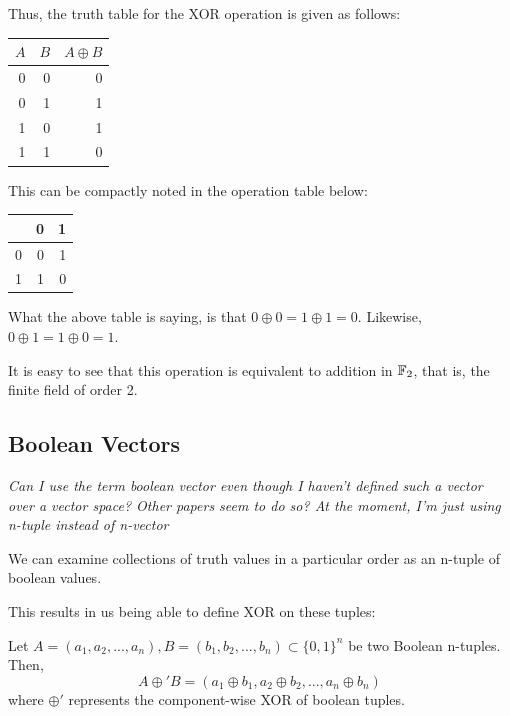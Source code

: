 Thus, the truth table for the XOR operation is given as follows:
\begin{center}
\begin{tabular}{|r|r|r|}
\hline
$A$ & $B$ & $A \oplus B$ \\\hline
0 & 0 & 0 \\\hline
0 & 1 & 1 \\\hline
1 & 0 & 1 \\\hline
1 & 1 & 0 \\\hline
\end{tabular}
\end{center}

This can be compactly noted in the operation table below:
\begin{center}
\begin{tabular}{|r|r|r|}
\hline  
& 0 & 1 \\\hline
0 & 0 & 1 \\\hline
1 & 1 & 0 \\\hline
\end{tabular}
\end{center}

What the above table is saying, is that $0 \oplus 0 = 1 \oplus 1 = 0$.
Likewise, $0 \oplus 1 = 1 \oplus 0 = 1$.

\begin{rem}
It is easy to see that this operation is equivalent to addition in ${\mathbb F}_2$,
that is, the finite field of order 2.
\end{rem}

\subsection{Boolean Vectors}

\emph{Can I use the term boolean vector even though I haven't defined
such a vector over a vector space? Other papers seem to do so?
At the moment, I'm just using n-tuple instead of n-vector}

We can examine collections of truth values in a particular order as an
n-tuple of boolean values. 

This results in us being able to define XOR on these tuples:

\begin{defn}
Let $A = (a_1, a_2, ... , a_n), B = (b_1, b_2, ... , b_n) \subset \{0,1\}^n$ be two Boolean n-tuples. Then,
\begin{equation}
A \oplus' B = (a_1 \oplus b_1, a_2 \oplus b_2, ... , a_n \oplus b_n)
\end{equation}
where $\oplus'$ represents the component-wise XOR of boolean tuples.
\end{defn}

